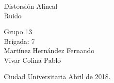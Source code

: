\begin{titlepage}
\begin{center}
         
         \Large{Distorsión Alineal}\\[1cm]
        
         \Large{Ruido}\\[1cm]
        
        
          \begin{flushright}
\footnotesize  Grupo 13\\[0.5cm]
\footnotesize Brigada: 7\\[0.5cm]
\footnotesize Martínez Hernández Fernando\\[0.5cm]
\footnotesize Vivar Colina Pablo\\[0.5cm]
 \end{flushright}
          \begin{flushleft}
        \footnotesize Ciudad Universitaria Abril de 2018.\\
          \end{flushleft}
         
          
   \end{center}
\end{titlepage}
